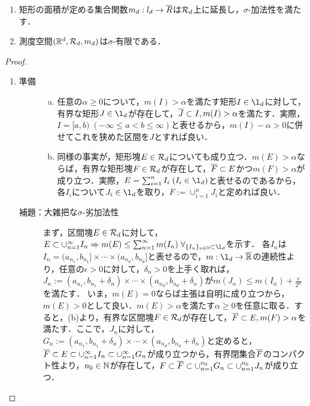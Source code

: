 \documentclass[uplatex, dvipdfmx]{jsreport}
\begin{document}
\begin{lemma}\mbox{}\label{lemma-Lebesgue-measure}
    \begin{enumerate}
        \item 矩形の面積が定める集合関数$m_d:l_d\to\overline{R}$は$\mathcal{R}_d$上に延長し，$\sigma$-加法性を満たす．
        \item 測度空間$(\mathbb{R}^d,\mathcal{R}_d,m_d)$は$\sigma$-有限である．
    \end{enumerate}
\end{lemma}
\begin{proof}\mbox{}
    \begin{enumerate}
        \item \begin{description}
            \item[準備] \begin{enumerate}[(a)]
                \item 任意の$\alpha\ge 0$について，$m(I)>\alpha$を満たす矩形$I\in\l_d$に対して，有界な矩形$J\in\l_d$が存在して，$\overline{J}\subset I,m(I)>\alpha$を満たす．実際，$I=[a,b)\;(-\infty\le a<b\le\infty)$と表せるから，$m(I)-\alpha>0$に併せてこれを狭めた区間を$J$とすれば良い．
                \item 同様の事実が，矩形塊$E\in\mathcal{R}_d$についても成り立つ．$m(E)>\alpha$ならば，有界な矩形塊$F\in\mathcal{R}_d$が存在して，$\overline{F}\subset E$かつ$m(F)>\alpha$が成り立つ．実際，$E=\sum^n_{i=1}I_i\;(I_i\in\l_d)$と表せるのであるから，各$I_i$について$J_i\in\l_d$を取り，$F:=\cup_{i=1}^nJ_i$と定めれば良い．
            \end{enumerate}
            \item[補題：大雑把な$\sigma$-劣加法性] まず，区間塊$E\in\mathcal{R}_d$に対して，$E\subset\cupn I_n\Rightarrow m(E)\le\sumn m(I_n)\;\forall_{\{I_n\}_{n\in\N}\subset\l_d}$を示す．
            各$I_n$は$I_n=(a_{n_1},b_{n_1}]\times\cdots\times(a_{n_d},b_{n_d}]$と表せるので，$m:\l_d\to\o{\R}$の連続性より，任意の$\epsilon>0$に対して，$\delta_n>0$を上手く取れば，$J_n:=(a_{n_1},b_{n_1}+\delta_n)\times\cdots\times(a_{n_d},b_{n_d}+\delta_n)$が$m(J_n)\le m(I_n)+\frac{\epsilon}{2^n}$を満たす．
            いま，$m(E)=0$ならば主張は自明に成り立つから，$m(E)>0$として良い．$m(E)>\alpha$を満たす$\alpha\ge 0$を任意に取る．すると，(b)より，有界な区間塊$F\in\mathcal{R}_d$が存在して，$\overline{F}\subset E,m(F)>\alpha$を満たす．ここで，$J_n$に対して，$G_n:=(a_{n_1},b_{n_1}+\delta_n)\times\cdots\times(a_{n_d},b_{n_d}+\delta_n)$と定めると，$\overline{F}\subset E\subset\cup_{n=1}^\infty I_n\subset\cup_{n=1}^\infty G_n$が成り立つから，有界閉集合$\overline{F}$のコンパクト性より，$n_0\in\mathbb{N}$が存在して，$F\subset\overline{F}\subset\cup_{n=1}^{n_0}G_n\subset\cup_{n=1}^{n_0}J_n$が成り立つ．

\end{description}
\end{enumerate}
\end{proof}
\end{document}
